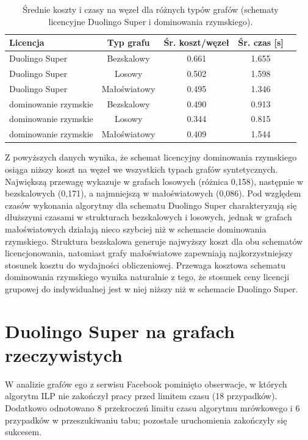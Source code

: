 \begin{table}[H]
  \centering
  \caption{Średnie koszty i czasy na węzeł dla różnych typów grafów (schematy licencyjne Duolingo Super i dominowania rzymskiego).}
  \label{tab:duo-synth-summary-times}
  \begin{tabular}{lcccc}
    \toprule
    \textbf{Licencja}    & \textbf{Typ grafu} & \textbf{Śr. koszt/węzeł} & \textbf{Śr. czas [s]} \\
    \midrule
    Duolingo Super       & Bezskalowy         & 0.661                    & 1.655                 \\
    Duolingo Super       & Losowy             & 0.502                    & 1.598                 \\
    Duolingo Super       & Małoświatowy       & 0.495                    & 1.346                 \\
    dominowanie rzymskie & Bezskalowy         & 0.490                    & 0.913                 \\
    dominowanie rzymskie & Losowy             & 0.344                    & 0.815                 \\
    dominowanie rzymskie & Małoświatowy       & 0.409                    & 1.544                 \\
    \bottomrule
  \end{tabular}
\end{table}

Z powyższych danych wynika, że schemat licencyjny dominowania rzymskiego osiąga niższy koszt na węzeł we wszystkich typach grafów syntetycznych. Największą przewagę wykazuje w grafach losowych (różnica 0{,}158), następnie w bezskalowych (0{,}171), a najmniejszą w małoświatowych (0{,}086). Pod względem czasów wykonania algorytmy dla schematu Duolingo Super charakteryzują się dłuższymi czasami w strukturach bezskalowych i losowych, jednak w grafach małoświatowych działają nieco szybciej niż w schemacie dominowania rzymskiego. Struktura bezskalowa generuje najwyższy koszt dla obu schematów licencjonowania, natomiast grafy małoświatowe zapewniają najkorzystniejszy stosunek kosztu do wydajności obliczeniowej. Przewaga kosztowa schematu dominowania rzymskiego wynika naturalnie z tego, że stosunek ceny licencji grupowej do indywidualnej jest w niej niższy niż w schemacie Duolingo Super.


\section{Duolingo Super na grafach rzeczywistych}
W analizie grafów ego z serwisu Facebook pominięto obserwacje, w których algorytm ILP nie zakończył pracy przed limitem czasu (18 przypadków). Dodatkowo odnotowano 8 przekroczeń limitu czasu algorytmu mrówkowego i 6 przypadków w przeszukiwaniu tabu; pozostałe uruchomienia zakończyły się sukcesem.

